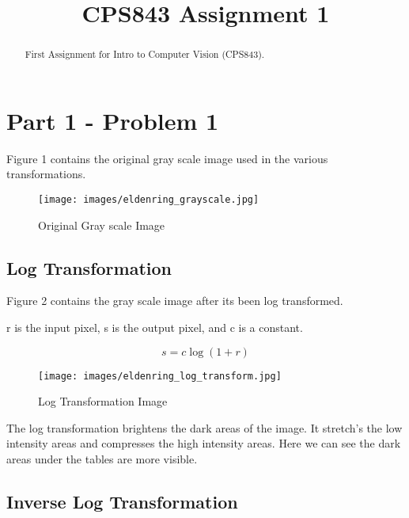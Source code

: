 \documentclass[conference]{IEEEtran}
\begin{document}
\title{CPS843 Assignment 1}

\author{
}

\maketitle

\begin{abstract}

First Assignment for Intro to Computer Vision (CPS843).

\end{abstract}

\section*{Part 1 - Problem 1}

Figure 1 contains the original gray scale image used in the various transformations.

\begin{figure}[htbp]
    \centering
    \texttt{[image: images/eldenring\_grayscale.jpg]}
    \caption{Original Gray scale Image}
\end{figure}

\subsection{Log Transformation}

Figure 2 contains the gray scale image after its been log transformed.

r is the input pixel, s is the output pixel, and c is a constant.

\begin{equation}
s=c\log{(1+r)}
\end{equation}

\begin{figure}[htbp]
    \centering
    \texttt{[image: images/eldenring\_log\_transform.jpg]}
    \caption{Log Transformation Image}
\end{figure}

The log transformation brightens the dark areas of the image. It stretch's the low intensity areas and compresses the high intensity areas. Here we can see the dark areas under the tables are more visible.

\subsection{Inverse Log Transformation}
\end{document}
